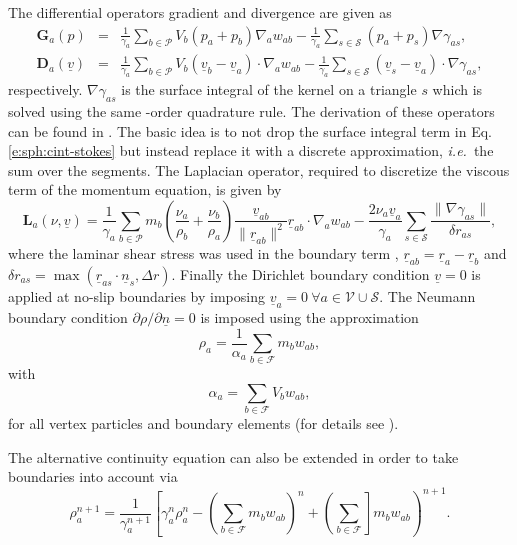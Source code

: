 \documentclass[12pt]{memoir}
\newcommand{\uvec}[1]{\underline{#1}}
\newcommand{\ie}{\textit{i.e.}~}
\newcommand{\sumF}{\underset{b \in \mathcal{F}}{\sum}}
\newcommand{\sumP}{\underset{b \in \mathcal{P}}{\sum}}
\newcommand{\sumS}{\underset{s \in \mathcal{S}}{\sum}}
\newcommand{\Grad}{\textbf{G}}
\newcommand{\Div}{\textbf{D}}
\newcommand{\Lap}{\textbf{L}}
\begin{document}
The differential operators gradient and divergence are given as
\begin{eqnarray}
\Grad_a(p) &=& \frac{1}{\gamma_a}\sumP V_b (p_a+p_b) \nabla_a w_{ab}
 -\frac{1}{\gamma_a}\sumS (p_a + p_s) \nabla \gamma_{as},
\label{e:sa:grad}
\\
\Div_a(\uvec{v}) &=& \frac{1}{\gamma_a}\sumP V_b (\uvec{v}_b - \uvec{v}_a) \cdot \nabla_a w_{ab}
 -\frac{1}{\gamma_a}\sumS (\uvec{v}_s - \uvec{v}_a) \cdot \nabla \gamma_{as},
\label{e:sa:div}
\end{eqnarray}
respectively. $\nabla \gamma_{as}$ is the surface integral of the kernel
on a triangle $s$ which is solved using the same -order
quadrature rule. The derivation of these operators can be found in
\cite{ferrand_unified_2012}. The basic idea is to not drop the surface
integral term in Eq. \eqref{e:sph:cint-stokes} but instead replace it
with a discrete approximation, \ie the sum over the segments. The Laplacian operator, required to discretize the viscous term of the momentum equation, is given by
\begin{equation}
\Lap_a(\nu, \uvec{v}) = \frac{1}{\gamma_a}\sumP m_b \left(\frac{\nu_a}{\rho_b} + \frac{\nu_b}{\rho_a}\right) \frac{\uvec{v}_{ab}}{\|\uvec{r}_{ab}\|^2}\uvec{r}_{ab}\cdot \nabla_a w_{ab}
 - \frac{2 \nu_a \uvec{v}_a}{\gamma_a} \sumS \frac{\|\nabla \gamma_{as}\|}{\delta r_{as}},
\label{e:sa:lap}
\end{equation}
where the laminar shear stress was used in the boundary term \cite{ferrand_unified_2012}, $\uvec{r}_{ab} = \uvec{r}_a - \uvec{r}_b$ and $\delta r_{as} = \max(\uvec{r}_{as}\cdot\uvec{n}_s, \Delta r)$. Finally the Dirichlet boundary condition $\uvec{v} = 0$ is applied at no-slip boundaries by imposing $\uvec{v}_a = 0\ \forall a \in \mathcal{V} \cup \mathcal{S}$. The Neumann boundary condition $\partial \rho/\partial \uvec{n} = 0$ is imposed using the approximation
\begin{equation}
\rho_a = \frac{1}{\alpha_a}\sumF m_b w_{ab},
\end{equation}
with
\begin{equation}
\alpha_a = \sumF V_b w_{ab},
\label{e:sa:alpha}
\end{equation}
for all vertex particles and boundary elements (for details see \cite{mayrhofer_investigation_2013}).

The alternative continuity equation can also be extended in order to
take boundaries into account via
\begin{equation}
\rho_a^{n+1} = \frac{1}{\gamma_a^{n+1}}\left[\gamma_a^n \rho_a^n - \left(\sumF m_b
w_{ab}\right)^n + \left(\sumF\right]
m_b w_{ab}\right)^{n+1}.
\label{e:sa:sumrho-time}
\end{equation}
\end{document}
